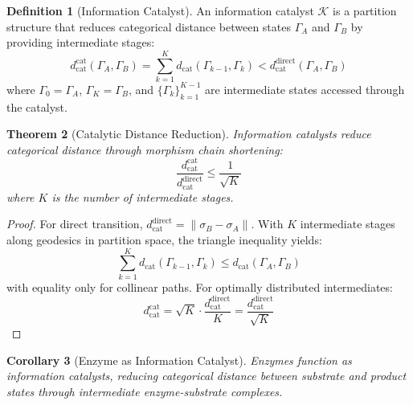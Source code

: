 \documentclass[10pt,twocolumn]{article}
\theoremstyle{plain}
\newtheorem{theorem}{Theorem}[section]
\newtheorem{corollary}[theorem]{Corollary}
\theoremstyle{definition}
\newtheorem{definition}[theorem]{Definition}
\theoremstyle{remark}
\newcommand{\Gstate}{\Gamma}
\newcommand{\dcat}{d_{\mathrm{cat}}}
\begin{document}
\begin{definition}[Information Catalyst]
\label{def:info_catalyst}
An information catalyst $\mathcal{K}$ is a partition structure that reduces categorical distance between states $\Gstate_A$ and $\Gstate_B$ by providing intermediate stages:
\begin{equation}
\dcat^{\mathrm{cat}}(\Gstate_A, \Gstate_B) = \sum_{k=1}^{K} \dcat(\Gstate_{k-1}, \Gstate_k) < \dcat^{\mathrm{direct}}(\Gstate_A, \Gstate_B)
\label{eq:info_catalyst}
\end{equation}
where $\Gstate_0 = \Gstate_A$, $\Gstate_K = \Gstate_B$, and $\{\Gstate_k\}_{k=1}^{K-1}$ are intermediate states accessed through the catalyst.
\end{definition}

\begin{theorem}[Catalytic Distance Reduction]
\label{thm:catalytic_reduction}
Information catalysts reduce categorical distance through morphism chain shortening:
\begin{equation}
\frac{\dcat^{\mathrm{cat}}}{\dcat^{\mathrm{direct}}} \leq \frac{1}{\sqrt{K}}
\label{eq:catalytic_bound}
\end{equation}
where $K$ is the number of intermediate stages.
\end{theorem}

\begin{proof}
For direct transition, $\dcat^{\mathrm{direct}} = \|\sigma_B - \sigma_A\|$. With $K$ intermediate stages along geodesics in partition space, the triangle inequality yields:
\begin{equation}
\sum_{k=1}^K \dcat(\Gstate_{k-1}, \Gstate_k) \leq \dcat(\Gstate_A, \Gstate_B)
\end{equation}
with equality only for collinear paths. For optimally distributed intermediates:
\begin{equation}
\dcat^{\mathrm{cat}} = \sqrt{K} \cdot \frac{\dcat^{\mathrm{direct}}}{K} = \frac{\dcat^{\mathrm{direct}}}{\sqrt{K}}
\end{equation}
\end{proof}

\begin{corollary}[Enzyme as Information Catalyst]
\label{cor:enzyme}
Enzymes function as information catalysts, reducing categorical distance between substrate and product states through intermediate enzyme-substrate complexes.
\end{corollary}

\end{document}
